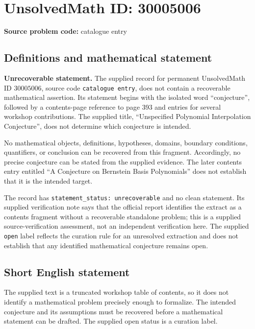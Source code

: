\documentclass[11pt]{article}
\begin{document}
\section*{UnsolvedMath ID: 30005006}
\textbf{Source problem code:} catalogue entry
\subsection{Definitions and mathematical statement}
\textbf{Unrecoverable statement.} The supplied record for permanent UnsolvedMath ID \(30005006\), source code \texttt{catalogue entry}, does not contain a recoverable mathematical assertion. Its statement begins with the isolated word ``conjecture'', followed by a contents-page reference to page 393 and entries for several workshop contributions. The supplied title, ``Unspecified Polynomial Interpolation Conjecture'', does not determine which conjecture is intended.

No mathematical objects, definitions, hypotheses, domains, boundary conditions, quantifiers, or conclusion can be recovered from this fragment. Accordingly, no precise conjecture can be stated from the supplied evidence. The later contents entry entitled ``A Conjecture on Bernstein Basis Polynomials'' does not establish that it is the intended target.

The record has \texttt{statement\_status: unrecoverable} and no clean statement. Its supplied verification note says that the official report identifies the extract as a contents fragment without a recoverable standalone problem; this is a supplied source-verification assessment, not an independent verification here. The supplied \texttt{open} label reflects the curation rule for an unresolved extraction and does not establish that any identified mathematical conjecture remains open.
\subsection{Short English statement}
The supplied text is a truncated workshop table of contents, so it does not identify a mathematical problem precisely enough to formalize. The intended conjecture and its assumptions must be recovered before a mathematical statement can be drafted. The supplied open status is a curation label.
\end{document}
